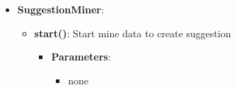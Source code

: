 \documentclass{article}
\begin{document}
\begin{itemize}
\begin{itemize}
			Get the suggestions (only user defined as municipality can access)
				\begin{itemize}
					\item \textbf{Parameters}:
						\begin{itemize}
							\item none
						\end{itemize}
					\item \textbf{Return}:
						\begin{itemize}
							\item suggestions: List\textlangle{}Suggestion\textrangle{}
						\end{itemize}
				\end{itemize}
		\end{itemize}
	\item \textbf{SuggestionMiner}:
		\begin{itemize}
			\item \textbf{start()}:
			Start mine data to create suggestion
				\begin{itemize}
					\item \textbf{Parameters}:
						\begin{itemize}
							\item none
						\end{itemize}
				\end{itemize}
		\end{itemize}
\end{itemize}

\newpage
\end{document}
